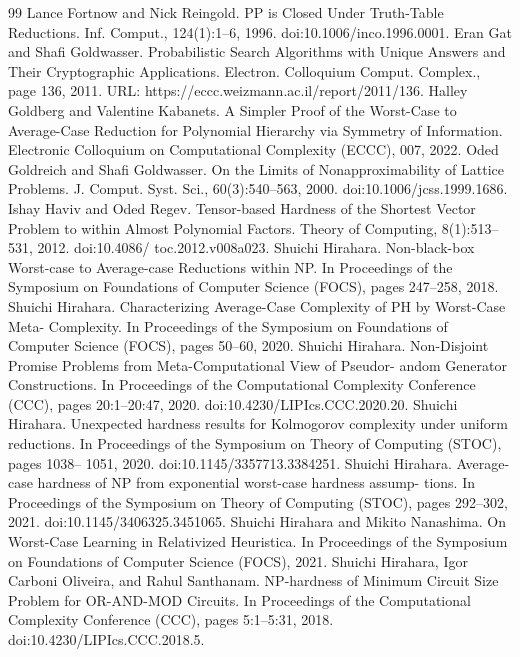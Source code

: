 \begin{thebibliography}{99}
 Lance Fortnow and Nick Reingold. PP is Closed Under Truth-Table Reductions. Inf. Comput., 124(1):1–6, 1996. doi:10.1006/inco.1996.0001.
 Eran Gat and Shafi Goldwasser. Probabilistic Search Algorithms with Unique Answers and Their Cryptographic Applications. Electron. Colloquium Comput. Complex., page 136, 2011. URL: https://eccc.weizmann.ac.il/report/2011/136.
 Halley Goldberg and Valentine Kabanets. A Simpler Proof of the Worst-Case to Average-Case Reduction for Polynomial Hierarchy via Symmetry of Information. Electronic Colloquium on Computational Complexity (ECCC), 007, 2022.
 Oded Goldreich and Shafi Goldwasser. On the Limits of Nonapproximability of Lattice Problems. J. Comput. Syst. Sci., 60(3):540–563, 2000. doi:10.1006/jcss.1999.1686.
 Ishay Haviv and Oded Regev. Tensor-based Hardness of the Shortest Vector Problem to within Almost Polynomial Factors. Theory of Computing, 8(1):513–531, 2012. doi:10.4086/ toc.2012.v008a023.
 Shuichi Hirahara. Non-black-box Worst-case to Average-case Reductions within NP. In Proceedings of the Symposium on Foundations of Computer Science (FOCS), pages 247–258, 2018.
 Shuichi Hirahara. Characterizing Average-Case Complexity of PH by Worst-Case Meta- Complexity. In Proceedings of the Symposium on Foundations of Computer Science (FOCS), pages 50–60, 2020.
 Shuichi Hirahara. Non-Disjoint Promise Problems from Meta-Computational View of Pseudor- andom Generator Constructions. In Proceedings of the Computational Complexity Conference (CCC), pages 20:1–20:47, 2020. doi:10.4230/LIPIcs.CCC.2020.20.
 Shuichi Hirahara. Unexpected hardness results for Kolmogorov complexity under uniform reductions. In Proceedings of the Symposium on Theory of Computing (STOC), pages 1038– 1051, 2020. doi:10.1145/3357713.3384251.
 Shuichi Hirahara. Average-case hardness of NP from exponential worst-case hardness assump- tions. In Proceedings of the Symposium on Theory of Computing (STOC), pages 292–302, 2021. doi:10.1145/3406325.3451065.
 Shuichi Hirahara and Mikito Nanashima. On Worst-Case Learning in Relativized Heuristica. In Proceedings of the Symposium on Foundations of Computer Science (FOCS), 2021.
 Shuichi Hirahara, Igor Carboni Oliveira, and Rahul Santhanam. NP-hardness of Minimum Circuit Size Problem for OR-AND-MOD Circuits. In Proceedings of the Computational Complexity Conference (CCC), pages 5:1–5:31, 2018. doi:10.4230/LIPIcs.CCC.2018.5.

\end{thebibliography}
